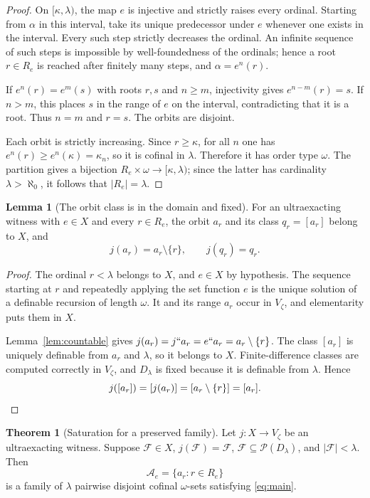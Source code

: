 \documentclass[11pt,letterpaper]{article}
\theoremstyle{definition}
\newtheorem{theorem}[definition]{Theorem}
\newtheorem{lemma}[definition]{Lemma}
\numberwithin{equation}{section}
\newcommand{\Pow}{\mathcal P}
\newcommand{\FF}{\mathcal F}
\newcommand{\calA}{\mathcal A}
\begin{document}
\begin{proof}
On $[\kappa,\lambda)$, the map $e$ is injective and strictly raises every ordinal. Starting from $\alpha$ in this interval, take its unique predecessor under $e$ whenever one exists in the interval. Every such step strictly decreases the ordinal. An infinite sequence of such steps is impossible by well-foundedness of the ordinals; hence a root $r\in R_e$ is reached after finitely many steps, and $\alpha=e^n(r)$.

If $e^n(r)=e^m(s)$ with roots $r,s$ and $n\ge m$, injectivity gives $e^{n-m}(r)=s$. If $n>m$, this places $s$ in the range of $e$ on the interval, contradicting that it is a root. Thus $n=m$ and $r=s$. The orbits are disjoint.

Each orbit is strictly increasing. Since $r\ge\kappa$, for all $n$ one has $e^n(r)\ge e^n(\kappa)=\kappa_n$, so it is cofinal in $\lambda$. Therefore it has order type $\omega$. The partition gives a bijection $R_e\times\omega\to[\kappa,\lambda)$; since the latter has cardinality $\lambda>\aleph_0$, it follows that $|R_e|=\lambda$.
\end{proof}

\begin{lemma}[The orbit class is in the domain and fixed]\label{lem:orbitfixed}
For an ultraexacting witness with $e\in X$ and every $r\in R_e$, the orbit $a_r$ and its class $q_r=[a_r]$ belong to $X$, and
\begin{equation}\label{eq:tail}
           j(a_r)=a_r\setminus\{r\},\qquad j(q_r)=q_r.
\end{equation}
\end{lemma}

\begin{proof}
The ordinal $r<\lambda$ belongs to $X$, and $e\in X$ by hypothesis. The sequence starting at $r$ and repeatedly applying the set function $e$ is the unique solution of a definable recursion of length $\omega$. It and its range $a_r$ occur in $V_\zeta$, and elementarity puts them in $X$.

Lemma~\ref{lem:countable} gives $j(a_r)=j``a_r=e``a_r=a_r\setminus\{r\}$. The class $[a_r]$ is uniquely definable from $a_r$ and $\lambda$, so it belongs to $X$. Finite-difference classes are computed correctly in $V_\zeta$, and $D_\lambda$ is fixed because it is definable from $\lambda$. Hence
\[
       j([a_r])=[j(a_r)]=[a_r\setminus\{r\}]=[a_r].\qedhere
\]
\end{proof}

\begin{theorem}[Saturation for a preserved family]\label{thm:preserved}
Let $j:X\to V_\zeta$ be an ultraexacting witness. Suppose $\FF\in X$, $j(\FF)=\FF$, $\FF\subseteq\Pow(D_\lambda)$, and $|\FF|<\lambda$. Then
\[
 \calA_e=\{a_r:r\in R_e\}
\]
is a family of $\lambda$ pairwise disjoint cofinal $\omega$-sets satisfying \eqref{eq:main}.
\end{theorem}
\end{document}

